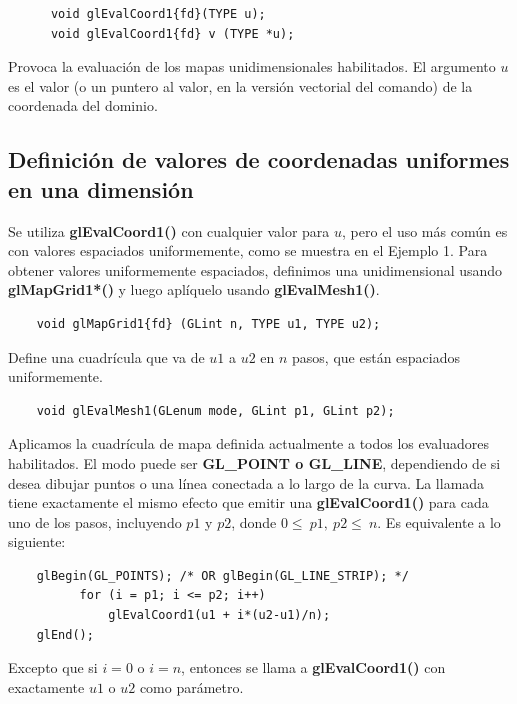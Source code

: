 \begin{lstlisting}
      void glEvalCoord1{fd}(TYPE u);
      void glEvalCoord1{fd} v (TYPE *u);
\end{lstlisting}
Provoca la evaluación de los mapas unidimensionales habilitados. El argumento $u$ es el valor (o un puntero al valor, en la versión vectorial del comando) de la coordenada del dominio. \\

\subsection{Definición de valores de coordenadas uniformes en una dimensión}

Se utiliza \textbf{glEvalCoord1()} con cualquier valor para $u$, pero el uso más común es con valores espaciados uniformemente, como se muestra en el Ejemplo 1. Para obtener valores uniformemente espaciados, definimos una unidimensional usando \textbf{glMapGrid1*()} y luego aplíquelo usando \textbf{glEvalMesh1()}.

\begin{lstlisting}
    void glMapGrid1{fd} (GLint n, TYPE u1, TYPE u2);
\end{lstlisting}
Define una cuadrícula que va de $u1$ a $u2$ en $n$ pasos, que están espaciados uniformemente.
\begin{lstlisting}
    void glEvalMesh1(GLenum mode, GLint p1, GLint p2);
\end{lstlisting}

Aplicamos la cuadrícula de mapa definida actualmente a todos los evaluadores habilitados. El modo puede ser \textbf{GL\_POINT o GL\_LINE}, dependiendo de si desea dibujar puntos o una línea conectada a lo largo de la curva. La llamada tiene exactamente el mismo efecto que emitir una \textbf{glEvalCoord1()} para cada uno de los pasos, incluyendo $p1$ y $p2$, donde $0\le\ p1,\ p2\le\ n$. Es equivalente a lo siguiente: \\

\begin{lstlisting}
    glBegin(GL_POINTS); /* OR glBegin(GL_LINE_STRIP); */
          for (i = p1; i <= p2; i++)
              glEvalCoord1(u1 + i*(u2-u1)/n);
    glEnd();
\end{lstlisting}

Excepto que si $i = 0$ o $i = n$, entonces se llama a \textbf{glEvalCoord1()} con exactamente $u1$ o $u2$ como parámetro.
